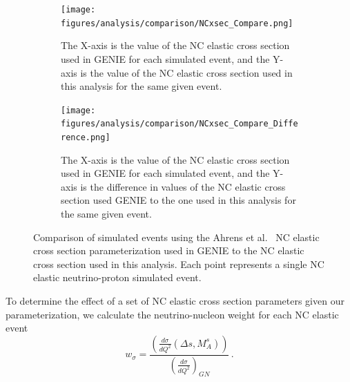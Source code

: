     \begin{figure}[ht]
      \centering
      \begin{subfigure}[t]{2.5in}
        \texttt{[image: figures/analysis/comparison/NCxsec\_Compare.png]}
        \caption{The X-axis is the value of the NC elastic cross section used
        in GENIE for each simulated event, and the Y-axis is the value of the
        NC elastic cross section used in this analysis for the same given
        event.}
      \end{subfigure}
      \hspace{2pt}
      \begin{subfigure}[t]{2.5in}
        \texttt{[image: figures/analysis/comparison/NCxsec\_Compare\_Difference.png]}
        \caption{The X-axis is the value of the NC elastic cross section used
        in GENIE for each simulated event, and the Y-axis is the difference in
        values of the NC elastic cross section used GENIE to the one used in
        this analysis for the same given event.}
      \end{subfigure}
      \caption{Comparison of simulated events using the Ahrens et
      al.~\cite{Ahrens} NC elastic cross section parameterization used in GENIE
      to the NC elastic cross section used in this analysis. Each point
      represents a single NC elastic neutrino-proton simulated event.}
      \label{fig:ncxseccompare}
    \end{figure}

    To determine the effect of a set of NC elastic cross section parameters
    given our parameterization, we calculate the neutrino-nucleon weight for
    each NC elastic event
    \begin{equation}\label{eq:xsecweight}
      w_\sigma = \frac{\left(\frac{d\sigma}{dQ^2}(\Delta s,M_A^s)\right)}
                      {\left(\frac{d\sigma}{dQ^2}\right)_{GN}} \,.
    \end{equation}


